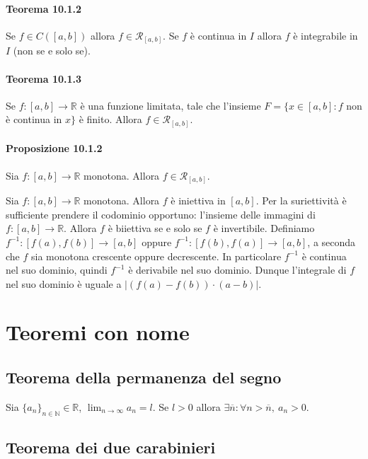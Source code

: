 \documentclass{article}
\begin{document}
\paragraph{Teorema 10.1.2} Se $f\in C([a,b])$ allora $f\in \mathcal{R}_{[a,b]}$. Se $f$ è continua in $I$ allora $f$ è integrabile in $I$ (non se e solo se).

\paragraph{Teorema 10.1.3} Se $f:[a,b] \rightarrow \mathbb{R}$ è una funzione limitata, tale che l'insieme $F=\{x \in [a,b]:f $ non è continua in $ x\}$ è finito. Allora $f\in \mathcal{R}_[a,b]$.

\paragraph{Proposizione 10.1.2} Sia $f:[a,b] \rightarrow \mathbb{R}$ monotona. Allora $f \in \mathcal{R}_{[a,b]}$.

 Sia $f:[a,b] \rightarrow \mathbb{R}$ monotona. 
Allora $f$ è iniettiva in $[a,b]$. 
Per la suriettività è sufficiente prendere il codominio opportuno: 
l'insieme delle immagini di $f:[a,b] \rightarrow \mathbb{R}$. 
Allora $f$ è biiettiva se e solo se $f$ è invertibile. Definiamo 
$f^{-1}:[f(a),f(b)]\rightarrow [a,b]$ oppure $f^{-1}:[f(b),f(a)]\rightarrow [a,b]$, 
a seconda che $f$ sia monotona crescente oppure decrescente.
In particolare $f^{-1}$ è continua nel suo dominio, quindi $f^{-1}$ è derivabile nel 
suo dominio. Dunque l'integrale di $f$ nel suo dominio è uguale a $|(f(a)- f(b))\cdot(a-b)|$.
\\

\section{Teoremi con nome}

\subsection{Teorema della permanenza del segno}

Sia $\{a_n\}_{n \in \mathbb{N}} \in \mathbb{R}$, $\lim_{n \to \infty}a_n= l$. Se $l>0$ allora $\exists \overline n : \forall n> \overline n, \ a_n>0 $.

\subsection{Teorema dei due carabinieri}
\end{document}
